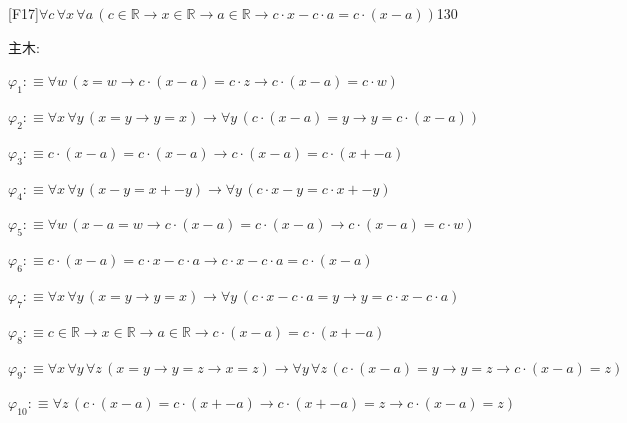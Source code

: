 \begin{fullproof}{[F17]}{$\forall c\,\forall x\,\forall a\,(c \in \mathbb{R} \to x \in \mathbb{R} \to a \in \mathbb{R} \to c \cdot x - c \cdot a = c \cdot (x - a))$}{130}
\begin{ptree}
\end{ptree}
\noindent 主木:
\begin{ptree}
\noLine
{}
\noLine
{}
\noLine
{}
\end{ptree}
\begin{abbrevlist}
\item $\varphi_{1} :\equiv \forall w\,(z = w \to c \cdot (x - a) = c \cdot z \to c \cdot (x - a) = c \cdot w)$
\item $\varphi_{2} :\equiv \forall x\,\forall y\,(x = y \to y = x) \to \forall y\,(c \cdot (x - a) = y \to y = c \cdot (x - a))$
\item $\varphi_{3} :\equiv c \cdot (x - a) = c \cdot (x - a) \to c \cdot (x - a) = c \cdot (x + -a)$
\item $\varphi_{4} :\equiv \forall x\,\forall y\,(x - y = x + -y) \to \forall y\,(c \cdot x - y = c \cdot x + -y)$
\item $\varphi_{5} :\equiv \forall w\,(x - a = w \to c \cdot (x - a) = c \cdot (x - a) \to c \cdot (x - a) = c \cdot w)$
\item $\varphi_{6} :\equiv c \cdot (x - a) = c \cdot x - c \cdot a \to c \cdot x - c \cdot a = c \cdot (x - a)$
\item $\varphi_{7} :\equiv \forall x\,\forall y\,(x = y \to y = x) \to \forall y\,(c \cdot x - c \cdot a = y \to y = c \cdot x - c \cdot a)$
\item $\varphi_{8} :\equiv c \in \mathbb{R} \to x \in \mathbb{R} \to a \in \mathbb{R} \to c \cdot (x - a) = c \cdot (x + -a)$
\item $\varphi_{9} :\equiv \forall x\,\forall y\,\forall z\,(x = y \to y = z \to x = z) \to \forall y\,\forall z\,(c \cdot (x - a) = y \to y = z \to c \cdot (x - a) = z)$
\item $\varphi_{10} :\equiv \forall z\,(c \cdot (x - a) = c \cdot (x + -a) \to c \cdot (x + -a) = z \to c \cdot (x - a) = z)$

\end{abbrevlist}
\end{fullproof}
